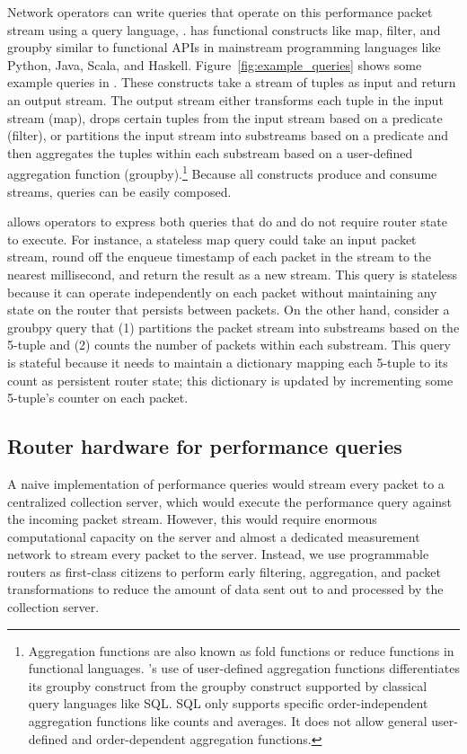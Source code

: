 Network operators can write queries that operate on this performance packet
stream using a query language, \TheSystem. \TheSystem has functional constructs
like {\ct map}, {\ct filter}, and {\ct groupby} similar to functional APIs in
mainstream programming languages like Python, Java, Scala, and Haskell.
Figure~\ref{fig:example_queries} shows some example queries in \TheSystem.
These constructs take a stream of tuples as input and return an output stream.
The output stream either transforms each tuple in the input stream ({\ct map}),
drops certain tuples from the input stream based on a predicate ({\ct filter}),
or partitions the input stream into substreams based on a predicate and then
aggregates the tuples within each substream based on a user-defined aggregation
function ({\ct groupby}).\footnote{Aggregation functions are also known as fold
functions or reduce functions in functional languages.  \TheSystem's use of
user-defined aggregation functions differentiates its groupby construct from
the groupby construct supported by classical query languages like SQL. SQL only
supports specific order-independent aggregation functions like counts and
averages. It does not allow general user-defined and order-dependent
aggregation functions.} Because all constructs produce and consume streams,
\TheSystem queries can be easily composed.

\TheSystem allows operators to express both queries that do and do not require
router state to execute. For instance, a stateless {\ct map} query could take
an input packet stream, round off the enqueue timestamp of each packet in the
stream to the nearest millisecond, and return the result as a new stream.  This
query is stateless because it can operate independently on each packet without
maintaining any state on the router that persists between packets. On the other
hand, consider a {\ct groubpy} query that (1) partitions the packet stream into
substreams based on the 5-tuple and (2) counts the number of packets within
each substream. This query is stateful because it needs to maintain a
dictionary mapping each 5-tuple to its count as persistent router state; this
dictionary is updated by incrementing some 5-tuple's counter on each packet.

\subsection{Router hardware for performance queries}

A naive implementation of performance queries would stream every packet to a
centralized collection server, which would execute the performance query
against the incoming packet stream. However, this would require enormous
computational capacity on the server and almost a dedicated measurement network
to stream every packet to the server. Instead, we use programmable routers as
first-class citizens to perform early filtering, aggregation, and packet
transformations to reduce the amount of data sent out to and processed by the
collection server.

